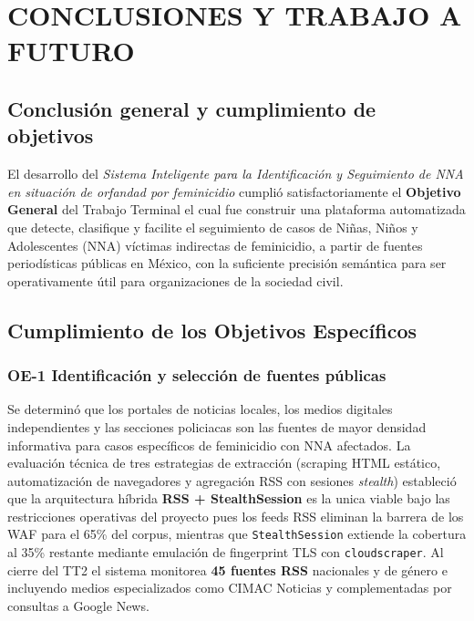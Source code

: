 

\chapter*{CONCLUSIONES Y TRABAJO A FUTURO}

\section*{Conclusión general y cumplimiento de objetivos}
\label{sec:conc_general}

El desarrollo del \textit{Sistema Inteligente para la Identificación y Seguimiento de NNA
en situación de orfandad por feminicidio} cumplió satisfactoriamente el \textbf{Objetivo
General} del Trabajo Terminal el cual fue construir una plataforma automatizada que detecte, clasifique
y facilite el seguimiento de casos de Niñas, Niños y Adolescentes (NNA) víctimas indirectas
de feminicidio, a partir de fuentes periodísticas públicas en México, con la suficiente
precisión semántica para ser operativamente útil para organizaciones de la sociedad civil.

\section*{Cumplimiento de los Objetivos Específicos}
\label{sec:conc_oe}

\subsection*{OE-1 Identificación y selección de fuentes públicas}
\label{subsec:conc_oe1}

Se determinó que los portales de noticias locales, los medios digitales independientes
y las secciones policiacas son las fuentes de mayor densidad informativa para casos
específicos de feminicidio con NNA afectados. La evaluación técnica de tres estrategias
de extracción (scraping HTML estático, automatización de navegadores y agregación RSS
con sesiones \textit{stealth}) estableció que la arquitectura híbrida
\textbf{RSS + StealthSession} es la unica viable bajo las restricciones
operativas del proyecto pues los feeds RSS eliminan la barrera de los WAF para el 65\%
del corpus, mientras que \texttt{StealthSession} extiende la cobertura al 35\%
restante mediante emulación de fingerprint TLS con \texttt{cloudscraper}.
Al cierre del TT2 el sistema monitorea \textbf{45 fuentes RSS} nacionales y de
género e incluyendo medios especializados como CIMAC Noticias y complementadas
por consultas a Google News.

